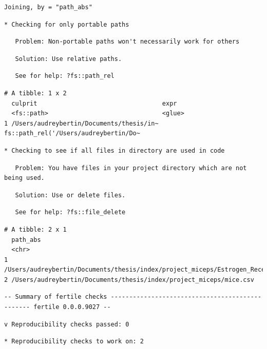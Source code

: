 \documentclass[12pt,twoside]{reedthesis}
\begin{document}
\begin{verbatim}
Joining, by = "path_abs"
\end{verbatim}
\begin{verbatim}
* Checking for only portable paths
\end{verbatim}
\begin{verbatim}
   Problem: Non-portable paths won't necessarily work for others
\end{verbatim}
\begin{verbatim}
   Solution: Use relative paths.
\end{verbatim}
\begin{verbatim}
   See for help: ?fs::path_rel
\end{verbatim}
\begin{verbatim}
# A tibble: 1 x 2
  culprit                                  expr                                 
  <fs::path>                               <glue>                               
1 /Users/audreybertin/Documents/thesis/in~ fs::path_rel('/Users/audreybertin/Do~
\end{verbatim}
\begin{verbatim}
* Checking to see if all files in directory are used in code
\end{verbatim}
\begin{verbatim}
   Problem: You have files in your project directory which are not being used.
\end{verbatim}
\begin{verbatim}
   Solution: Use or delete files.
\end{verbatim}
\begin{verbatim}
   See for help: ?fs::file_delete
\end{verbatim}
\begin{verbatim}
# A tibble: 2 x 1
  path_abs                                                                      
  <chr>                                                                         
1 /Users/audreybertin/Documents/thesis/index/project_miceps/Estrogen_Receptors.~
2 /Users/audreybertin/Documents/thesis/index/project_miceps/mice.csv            
\end{verbatim}
\begin{verbatim}
-- Summary of fertile checks ------------------------------------------------ fertile 0.0.0.9027 --
\end{verbatim}
\begin{verbatim}
v Reproducibility checks passed: 0
\end{verbatim}
\begin{verbatim}
* Reproducibility checks to work on: 2
\end{verbatim}
\end{document}
